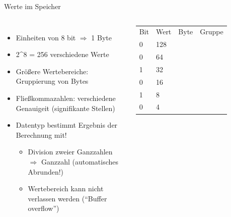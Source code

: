 \begin{frame}[fragile]{Werte im Speicher}
%
\begin{columns}[T]
\begin{itemize}
\item Einheiten von 8 bit $\Rightarrow$ 1 Byte
\item 2{\^{}}8 = 256 verschiedene Werte
\item Größere Wertebereiche: Gruppierung von Bytes
\item Fließkommazahlen: verschiedene Genauigeit (signifikante Stellen)
\item Datentyp bestimmt Ergebnis der Berechnung mit!
	\begin{itemize}
	\item Division zweier Ganzzahlen $\Rightarrow$ Ganzzahl (automatisches Abrunden!)
	\item Wertebereich kann nicht verlassen werden (\enquote{Buffer overflow})
	\end{itemize}
\end{itemize}
%
\scriptsize
\begin{table}
\begin{tabularx}
	{\linewidth}
	{RRCC}
	
	Bit & 
	Wert & 
	Byte & 
	Gruppe \\
	
	   0 & 
	 128 & 
	          &
	 \\
	
	0 & 64 &
	          &
	 \\
	
	   1 &  
	  32 &
	          &
	 \\
	
	0 & 16 & 
	          &
	 \\
	
	   1 &
	   8 &
	          &
	 \\
	
	0 & 4 & 
	          &
	 \\
	

\end{tabularx}
\end{table}
\end{columns}
\end{frame}
